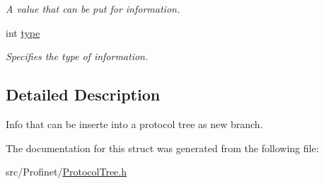 \begin{DoxyCompactItemize}
\begin{DoxyCompactList}\small\item\em A value that can be put for information. \end{DoxyCompactList}\item 
\hypertarget{struct_header_info_a185f6002ab6c59872350531b5121de98}{int \hyperlink{struct_header_info_a185f6002ab6c59872350531b5121de98}{type}}\label{struct_header_info_a185f6002ab6c59872350531b5121de98}

\begin{DoxyCompactList}\small\item\em Specifies the type of information. \end{DoxyCompactList}\end{DoxyCompactItemize}


\subsection{Detailed Description}
Info that can be inserte into a protocol tree as new branch. 

The documentation for this struct was generated from the following file\-:\begin{DoxyCompactItemize}
\item 
src/\-Profinet/\hyperlink{_protocol_tree_8h}{Protocol\-Tree.\-h}\end{DoxyCompactItemize}
